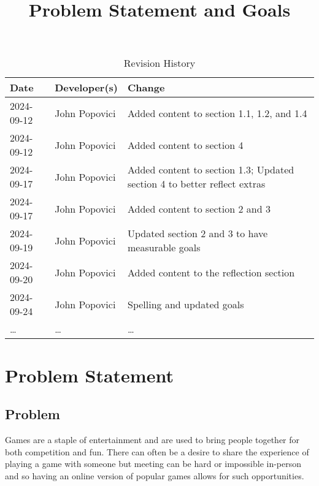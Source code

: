 \documentclass{article}
\title{Problem Statement and Goals\\\progname}
\author{\authname}
\date{}
\begin{document}
\maketitle

\begin{table}[hp]
\caption{Revision History} \label{TblRevisionHistory}
\begin{tabularx}{\textwidth}{llX}
\toprule
\textbf{Date} & \textbf{Developer(s)} & \textbf{Change}\\
\midrule
2024-09-12 & John Popovici & Added content to section 1.1, 1.2, and 1.4\\
2024-09-12 & John Popovici & Added content to section 4\\
2024-09-17 & John Popovici & Added content to section 1.3; Updated section 4 to better reflect extras\\
2024-09-17 & John Popovici & Added content to section 2 and 3\\
2024-09-19 & John Popovici & Updated section 2 and 3 to have measurable goals\\
2024-09-20 & John Popovici & Added content to the reflection section\\
2024-09-24 & John Popovici & Spelling and updated goals\\
\dots & \dots & \dots\\
\bottomrule
\end{tabularx}
\end{table}

\newpage
\section{Problem Statement}


\subsection{Problem}

Games are a staple of entertainment and are used to bring people together for both competition and fun.
There can often be a desire to share the experience of playing a game with someone but meeting can be hard or impossible in-person and so having an online version of popular games allows for such opportunities.
\end{document}
